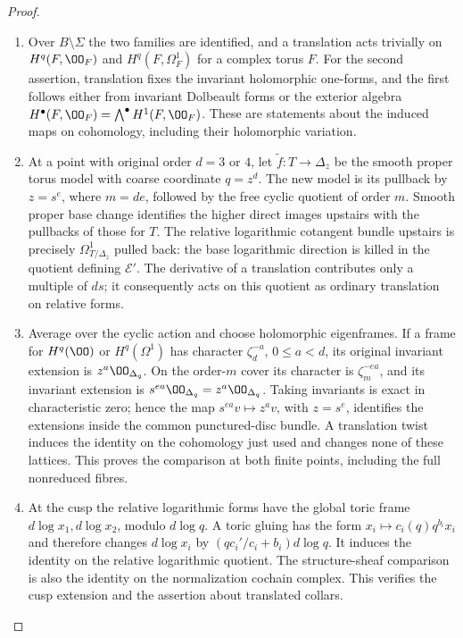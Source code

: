 \begin{proof}
\begin{enumerate}[label=\arabic*.,leftmargin=*]
\item Over $B\setminus\Sigma$
the two families are identified, and a translation acts trivially on
$H^q(F,\OO_F)$ and $H^q(F,\Omega^1_F)$ for a complex torus $F$.
For the second assertion, translation fixes the invariant holomorphic
one-forms, and the first follows either from invariant Dolbeault forms
or the exterior algebra $H^\bullet(F,\OO_F)=\bigwedge^\bullet H^1(F,\OO_F)$.
These are statements about the induced maps on cohomology, including
their holomorphic variation.

\item At a point with original order $d=3$ or $4$, let
$\widetilde f:T\to\Delta_z$ be the smooth proper torus model with
coarse coordinate $q=z^d$. The new model is its pullback by $z=s^e$,
where $m=de$, followed by the free cyclic quotient of order $m$.
Smooth proper base change identifies the higher direct images upstairs
with the pullbacks of those for $T$. The relative logarithmic cotangent
bundle upstairs is precisely $\Omega^1_{T/\Delta_z}$ pulled back:
the base logarithmic direction is killed in the quotient defining $\mathcal E'$.
The derivative of a translation contributes only a multiple of $ds$;
it consequently acts on this quotient as ordinary translation on relative forms.

\item Average over the cyclic action and choose holomorphic eigenframes.
If a frame for $H^q(\OO)$ or $H^q(\Omega^1)$ has character
$\zeta_d^{-a}$, $0\le a<d$, its original invariant extension is
$z^a\OO_{\Delta_q}$. On the order-$m$ cover its character is
$\zeta_m^{-ea}$, and its invariant extension is
$s^{ea}\OO_{\Delta_q}=z^a\OO_{\Delta_q}$.
Taking invariants is exact in characteristic zero; hence the map $s^{ea}v\mapsto z^av$, with $z=s^e$,
identifies the extensions inside the common punctured-disc bundle. A translation
twist induces the identity on the cohomology just used and changes none
of these lattices. This proves the comparison at both finite points,
including the full nonreduced fibres.

\item At the cusp the relative logarithmic forms have the global toric frame
$d\log x_1,d\log x_2$, modulo $d\log q$.
A toric gluing has the form
$x_i\mapsto c_i(q)q^{b_i}x_i$ and therefore changes $d\log x_i$ by
$(q c_i'/c_i+b_i)d\log q$. It induces the identity on the relative
logarithmic quotient. The structure-sheaf comparison is also the identity
on the normalization cochain complex. This verifies the cusp extension
and the assertion about translated collars.


\end{enumerate}
\end{proof}
